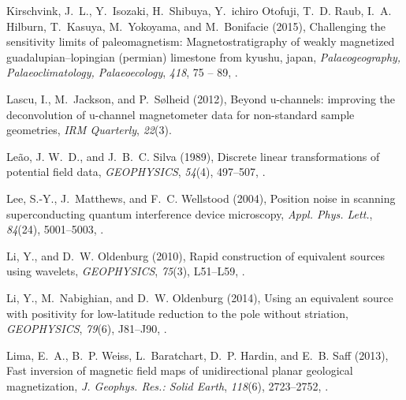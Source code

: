 \documentclass[draft,gc]{agutex}
\begin{document}
\begin{article}
\begin{thebibliography}{56}
Kirschvink, J.~L., Y.~Isozaki, H.~Shibuya, Y.~ichiro Otofuji, T.~D. Raub, I.~A.
  Hilburn, T.~Kasuya, M.~Yokoyama, and M.~Bonifacie (2015), Challenging the
  sensitivity limits of paleomagnetism: Magnetostratigraphy of weakly
  magnetized guadalupian–lopingian (permian) limestone from kyushu, japan,
  \textit{Palaeogeography, Palaeoclimatology, Palaeoecology}, \textit{418}, 75
  -- 89, .

Lascu, I., M.~Jackson, and P.~S{\o}lheid (2012), Beyond u-channels: improving
  the deconvolution of u-channel magnetometer data for non-standard sample
  geometries, \textit{IRM Quarterly}, \textit{22}(3).

Le\~{a}o, J. W.~D., and J.~B.~C. Silva (1989), Discrete linear transformations
  of potential field data, \textit{GEOPHYSICS}, \textit{54}(4), 497--507,
  .

Lee, S.-Y., J.~Matthews, and F.~C. Wellstood (2004), Position noise in scanning
  superconducting quantum interference device microscopy, \textit{Appl. Phys.
  Lett.}, \textit{84}(24), 5001--5003, .

Li, Y., and D.~W. Oldenburg (2010), Rapid construction of equivalent sources
  using wavelets, \textit{GEOPHYSICS}, \textit{75}(3), L51--L59,
  .

Li, Y., M.~Nabighian, and D.~W. Oldenburg (2014), Using an equivalent source
  with positivity for low-latitude reduction to the pole without striation,
  \textit{GEOPHYSICS}, \textit{79}(6), J81--J90, .

Lima, E.~A., B.~P. Weiss, L.~Baratchart, D.~P. Hardin, and E.~B. Saff (2013),
  Fast inversion of magnetic field maps of unidirectional planar geological
  magnetization, \textit{J. Geophys. Res.: Solid Earth}, \textit{118}(6),
  2723--2752, .


\end{thebibliography}
\end{article}
\end{document}
